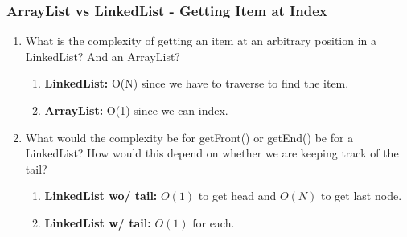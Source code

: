 \documentclass{beamer}
\begin{document}
\begin{frame}
    \frametitle{ArrayList vs LinkedList - Getting Item at Index}
    \begin{enumerate}
		\item What is the complexity of getting an item at an arbitrary position in a LinkedList? And an ArrayList?
            \pause
		\begin{enumerate}
			\item \textbf{LinkedList:} O(N) since we have to traverse to find the item.
			\item \textbf{ArrayList:} O(1) since we can index.
		\end{enumerate}
            \pause
		\item What would the complexity be for getFront() or getEnd() be for a LinkedList? How would this depend on whether we are keeping track of the tail?
            \pause
		\begin{enumerate}
			\item \textbf{LinkedList wo/ tail:} $O(1)$ to get head and $O(N)$ to get last node.
			\item \textbf{LinkedList w/ tail:} $O(1)$ for each.
		\end{enumerate}
    \end{enumerate}
\end{frame}
\end{document}
